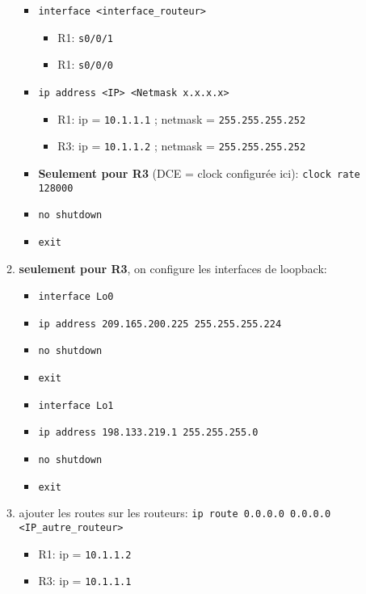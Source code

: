 \documentclass[a4paper]{article}
\begin{document}
\begin{enumerate}
\begin{enumerate}
\begin{itemize}
        \item \texttt{interface <interface\_routeur>}
        \begin{example}
            \begin{itemize}
                \item R1: \texttt{s0/0/1}
                \item R1: \texttt{s0/0/0}
            \end{itemize}
        \end{example}
        \item \texttt{ip address <IP> <Netmask x.x.x.x>}
        \begin{example}
            \begin{itemize}
                \item R1: ip = \texttt{10.1.1.1} \; ; \; netmask = \texttt{255.255.255.252}
                \item R3: ip = \texttt{10.1.1.2} \; ; \; netmask = \texttt{255.255.255.252}
            \end{itemize}
        \end{example}
        \item \textbf{Seulement pour R3} (DCE = clock configurée ici): \texttt{clock rate 128000}
        \item \texttt{no shutdown}
        \item \texttt{exit}
    \end{itemize}
    \item \textbf{seulement pour R3}, on configure les interfaces de loopback:
    \begin{itemize}
        \item \texttt{interface Lo0}
        \item \texttt{ip address 209.165.200.225 255.255.255.224}
        \item \texttt{no shutdown}
        \item \texttt{exit}
        \item \texttt{interface Lo1}
        \item \texttt{ip address 198.133.219.1 255.255.255.0}
        \item \texttt{no shutdown}
        \item \texttt{exit}
    \end{itemize}
    \item ajouter les routes sur les routeurs: \texttt{ip route 0.0.0.0 0.0.0.0 <IP\_autre\_routeur>}
    \begin{example}
        \begin{itemize}
            \item R1: ip = \texttt{10.1.1.2}
            \item R3: ip = \texttt{10.1.1.1}
        \end{itemize}
    \end{example}
\end{enumerate}



\end{enumerate}
\end{document}
